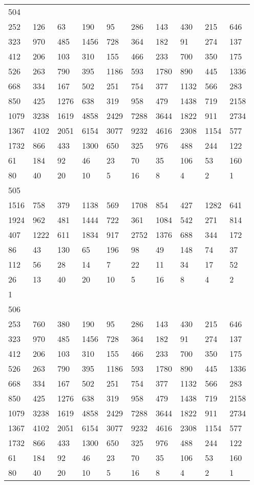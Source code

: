 \begin{longtable}{*{10}{l}}
504&&&&&&&&&\\
252& 126& 63& 190& 95& 286& 143& 430& 215& 646\\
323& 970& 485& 1456& 728& 364& 182& 91& 274& 137\\
412& 206& 103& 310& 155& 466& 233& 700& 350& 175\\
526& 263& 790& 395& 1186& 593& 1780& 890& 445& 1336\\
668& 334& 167& 502& 251& 754& 377& 1132& 566& 283\\
850& 425& 1276& 638& 319& 958& 479& 1438& 719& 2158\\
1079& 3238& 1619& 4858& 2429& 7288& 3644& 1822& 911& 2734\\
1367& 4102& 2051& 6154& 3077& 9232& 4616& 2308& 1154& 577\\
1732& 866& 433& 1300& 650& 325& 976& 488& 244& 122\\
61& 184& 92& 46& 23& 70& 35& 106& 53& 160\\
80& 40& 20& 10& 5& 16& 8& 4& 2& 1\\

505&&&&&&&&&\\
1516& 758& 379& 1138& 569& 1708& 854& 427& 1282& 641\\
1924& 962& 481& 1444& 722& 361& 1084& 542& 271& 814\\
407& 1222& 611& 1834& 917& 2752& 1376& 688& 344& 172\\
86& 43& 130& 65& 196& 98& 49& 148& 74& 37\\
112& 56& 28& 14& 7& 22& 11& 34& 17& 52\\
26& 13& 40& 20& 10& 5& 16& 8& 4& 2\\
1& \\

506&&&&&&&&&\\
253& 760& 380& 190& 95& 286& 143& 430& 215& 646\\
323& 970& 485& 1456& 728& 364& 182& 91& 274& 137\\
412& 206& 103& 310& 155& 466& 233& 700& 350& 175\\
526& 263& 790& 395& 1186& 593& 1780& 890& 445& 1336\\
668& 334& 167& 502& 251& 754& 377& 1132& 566& 283\\
850& 425& 1276& 638& 319& 958& 479& 1438& 719& 2158\\
1079& 3238& 1619& 4858& 2429& 7288& 3644& 1822& 911& 2734\\
1367& 4102& 2051& 6154& 3077& 9232& 4616& 2308& 1154& 577\\
1732& 866& 433& 1300& 650& 325& 976& 488& 244& 122\\
61& 184& 92& 46& 23& 70& 35& 106& 53& 160\\
80& 40& 20& 10& 5& 16& 8& 4& 2& 1\\


\end{longtable}
